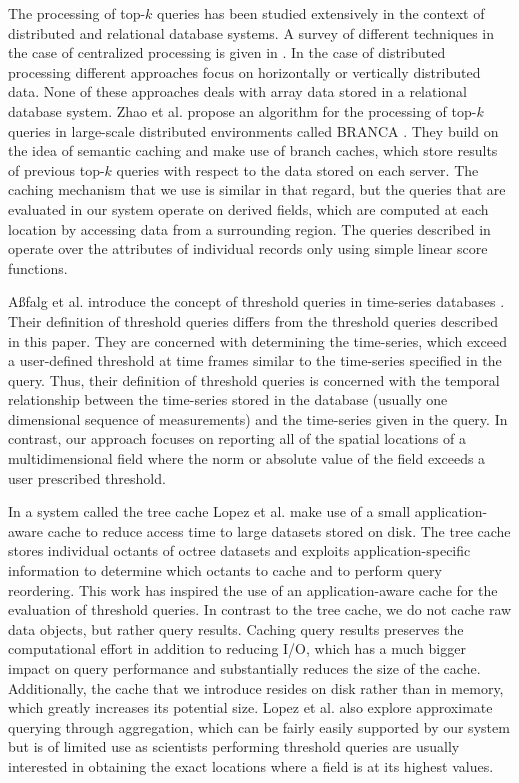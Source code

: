\documentclass{sig-alternate}
\begin{document}
The processing of top-$k$ queries has been studied extensively in the context of distributed and relational database systems. A survey of different techniques
in the case of centralized processing is given in \cite{Ilyas}. In the case of distributed processing different approaches focus on horizontally 
\cite{Balke, Vlachou} or vertically \cite{Cao, Chaudhuri, Guntzer, Marian, Michel} distributed data. None of these approaches deals with array data stored in
a relational database system. Zhao et al. propose an algorithm for the processing of top-$k$ queries in large-scale distributed environments called BRANCA
\cite{Zhao}. They build on the idea of semantic caching \cite{Ren} and make use of branch caches, which store results of previous top-$k$ queries with respect 
to the data stored on each server. The caching mechanism that we use is similar in that regard, but the queries that are evaluated in our system operate on
derived fields, which are computed at each location by accessing data from a surrounding region. The queries described in \cite{Zhao} operate over the 
attributes of individual records only using simple linear score functions.

A{\ss}falg et al. introduce the concept of threshold queries in time-series databases \cite{Asfalg}. Their definition of threshold queries differs from the threshold
queries described in this paper. They are concerned with determining the time-series, which exceed a user-defined threshold at time frames similar to
the time-series specified in the query. Thus, their definition of threshold queries is concerned with the temporal relationship between the time-series
stored in the database (usually one dimensional sequence of measurements) and the time-series given in the query. In contrast, our approach focuses on
reporting all of the spatial locations of a multidimensional field where the norm or absolute value of the field exceeds a user prescribed threshold.

In a system called the tree cache Lopez et al. \cite{Lopez} make use of a small application-aware cache to reduce access time to large datasets stored on
disk. The tree cache stores individual octants of octree datasets and exploits application-specific information to determine which octants to cache and to 
perform query reordering. This work has inspired the use of an application-aware cache for the evaluation of threshold queries. In contrast to the tree cache,
we do not cache raw data objects, but rather query results. Caching query results preserves the computational effort in addition to reducing I/O, which has a
much bigger impact on query performance and substantially reduces the size of the cache. Additionally, the cache that we introduce resides on disk rather 
than in memory, which greatly increases its potential size. Lopez et al. also explore approximate querying through aggregation, which can be fairly easily
supported by our system but is of limited use as scientists performing threshold queries are usually interested in obtaining the exact locations where a field is 
at its highest values.
\end{document}
